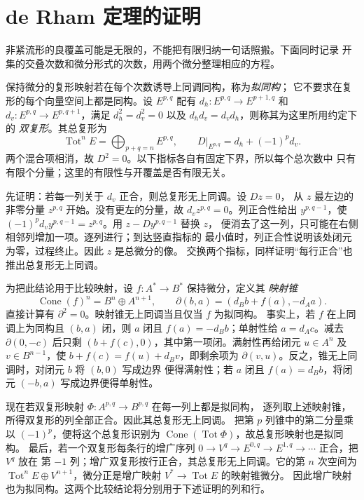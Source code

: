 \section{de Rham 定理的证明}

非紧流形的良覆盖可能是无限的，不能把有限归纳一句话照搬。下面同时记录
开集的交叠次数和微分形式的次数，用两个微分整理相应的方程。

保持微分的复形映射若在每个次数诱导上同调同构，称为\emph{拟同构}；
它不要求在复形的每个向量空间上都是同构。设 $E^{p,q}$ 配有
$d_h:E^{p,q}\to E^{p+1,q}$ 和 $d_v:E^{p,q}\to E^{p,q+1}$，满足
$d_h^2=d_v^2=0$ 以及 $d_hd_v=d_vd_h$，则称其为这里所用约定下的
\emph{双复形}。其总复形为
\[
 \operatorname{Tot}^n E=\bigoplus_{p+q=n}E^{p,q},
 \qquad D|_{E^{p,q}}=d_h+(-1)^p d_v.
\]
两个混合项相消，故 $D^2=0$。以下指标各自有固定下界，所以每个总次数中
只有有限个分量；这里的有限性与开覆盖是否有限无关。

先证明：若每一列关于 $d_v$ 正合，则总复形无上同调。设 $Dz=0$，
从 $z$ 最左边的非零分量 $z^{p,q}$ 开始。没有更左的分量，故
$d_vz^{p,q}=0$。列正合性给出 $y^{p,q-1}$，使
$(-1)^p d_vy^{p,q-1}=z^{p,q}$。用 $z-Dy^{p,q-1}$ 替换 $z$，
便消去了这一列，只可能在右侧相邻列增加一项。逐列进行；到达竖直指标的
最小值时，列正合性说明该处闭元为零，过程终止。因此 $z$ 是总微分的像。
交换两个指标，同样证明“每行正合”也推出总复形无上同调。

为把此结论用于比较映射，设 $f:A^*\to B^*$ 保持微分，定义其
\emph{映射锥}
\[
 \operatorname{Cone}(f)^n=B^n\oplus A^{n+1},
 \qquad \partial(b,a)=(d_Bb+f(a),-d_Aa).
\]
直接计算有 $\partial^2=0$。映射锥无上同调当且仅当 $f$ 为拟同构。
事实上，若 $f$ 在上同调上为同构且 $(b,a)$ 闭，则 $a$ 闭且
$f(a)=-d_Bb$；单射性给 $a=d_Ac$。减去 $\partial(0,-c)$ 后只剩
$(b+f(c),0)$，其中第一项闭。满射性再给闭元 $u\in A^n$ 及
$v\in B^{n-1}$，使 $b+f(c)=f(u)+d_Bv$，即剩余项为
$\partial(v,u)$。反之，锥无上同调时，对闭元 $b$ 将 $(b,0)$ 写成边界
便得满射性；若 $a$ 闭且 $f(a)=d_Bb$，将闭元 $(-b,a)$ 写成边界便得单射性。

现在若双复形映射 $\Phi:A^{p,q}\to B^{p,q}$ 在每一列上都是拟同构，
逐列取上述映射锥，所得双复形的列全部正合。因此其总复形无上同调。
把第 $p$ 列锥中的第二分量乘以 $(-1)^p$，便将这个总复形识别为
$\operatorname{Cone}(\operatorname{Tot}\Phi)$，故总复形映射也是拟同构。
最后，若一个双复形每条行的增广序列
$0\to V^q\to E^{0,q}\to E^{1,q}\to\cdots$ 正合，把 $V^q$ 放在
第 $-1$ 列；增广双复形按行正合，其总复形无上同调。它的第 $n$ 次空间为
$\operatorname{Tot}^nE\oplus V^{n+1}$，微分正是增广映射
$V^*\to\operatorname{Tot}E$ 的映射锥微分。
因此增广映射也为拟同构。这两个比较结论将分别用于下述证明的列和行。

